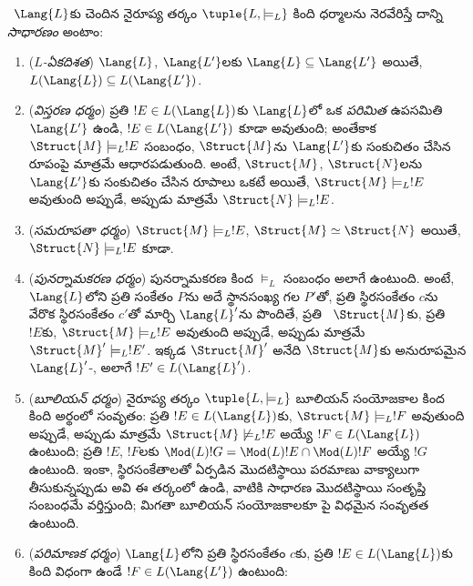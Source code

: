 \documentclass[../../../include/open-logic-section]{subfiles}
\begin{document}
\begin{defn}
~$\Lang{L}$కు చెందిన నైరూప్య తర్కం
$\tuple{L,\models_L}$ కింది ధర్మాలను నెరవేరిస్తే దాన్ని
\emph{సాధారణం} అంటాం:
\begin{enumerate}
\item (\emph{$L$-ఏకదిశత}) 
  $\Lang{L}$, $\Lang{L'}$లకు $\Lang{L} \subseteq \Lang{L'}$ అయితే,
  $L(\Lang{L}) \subseteq L(\Lang{L'})$.
\item (\emph{విస్తరణ ధర్మం}) ప్రతి $!E \in L(\Lang{L})$కు
  $\Lang{L}$లో ఒక \emph{పరిమిత} ఉపసమితి $\Lang{L'}$ ఉండి,
  $!E \in L(\Lang{L'})$ కూడా అవుతుంది; అంతేకాక $\Struct{M}
  \models_L !E$ సంబంధం, $\Struct{M}$ను $\Lang{L'}$కు సంకుచితం చేసిన
  రూపంపై మాత్రమే ఆధారపడుతుంది. అంటే, $\Struct{M}$, $\Struct{N}$లను
  $\Lang{L'}$కు సంకుచితం చేసిన రూపాలు ఒకటే అయితే, $\Struct{M}
  \models_L !E$ అవుతుంది అప్పుడే, అప్పుడు మాత్రమే $\Struct{N} \models_L !E$.
%
%
%
%
%
\item (\emph{సమరూపతా ధర్మం}) $\Struct{M} \models_L !E$,
  $\Struct{M} \simeq \Struct{N}$ అయితే, $\Struct{N} \models_L !E$
  కూడా.
\item (\emph{పునర్నామకరణ ధర్మం}) పునర్నామకరణ కింద $\models_L$
  సంబంధం అలాగే ఉంటుంది. అంటే, ~$\Lang{L}$లోని
  ప్రతి సంకేతం $P$ను అదే స్థానసంఖ్య గల $P'$తో, ప్రతి స్థిరసంకేతం $c$ను
  వేరొక స్థిరసంకేతం $c'$తో మార్చి $\Lang{L}'$ను పొందితే, ప్రతి
  ~$\Struct{M}$కు, ప్రతి
  ~$!E$కు, $\Struct{M} \models_L !E$
  అవుతుంది అప్పుడే, అప్పుడు మాత్రమే $\Struct{M}' \models_L !E'$. ఇక్కడ
  $\Struct{M}'$ అనేది $\Struct{M}$కు అనురూపమైన
  $\Lang{L}'$-, అలాగే $!E' \in
  L(\Lang{L}')$.
\item (\emph{బూలియన్ ధర్మం}) నైరూప్య తర్కం $\tuple{L,\models_L}$
  బూలియన్ సంయోజకాల కింద కింది అర్థంలో సంవృతం: ప్రతి $!E \in
  L(\Lang{L})$కు, $\Struct{M} \models_L !F$ అవుతుంది అప్పుడే, అప్పుడు మాత్రమే
  $\Struct{M} \not\models_L !E$ అయ్యే $!F \in L(\Lang{L})$ ఉంటుంది;
  ప్రతి $!E$, $!F$లకు $\Mod(L){!G} = \Mod(L){!E} \cap
  \Mod(L){!F}$ అయ్యే $!G$ ఉంటుంది. ఇంకా, స్థిరసంకేతాలతో ఏర్పడిన
  మొదటిస్థాయి పరమాణు  వాక్యాలుగా
  తీసుకున్నప్పుడు అవి ఈ తర్కంలో ఉండి, వాటికి సాధారణ మొదటిస్థాయి సంతృప్తి
  సంబంధమే వర్తిస్తుంది; మిగతా బూలియన్ సంయోజకాలకూ పై విధమైన సంవృతత
  ఉంటుంది.
\item (\emph{పరిమాణక ధర్మం}) $\Lang{L}$లోని ప్రతి స్థిరసంకేతం $c$కు,
  ప్రతి $!E \in L(\Lang{L})$కు కింది విధంగా ఉండే $!F \in
  L(\Lang{L'})$ ఉంటుంది:
  \[
\]
\end{enumerate}
\end{defn}
\end{document}
